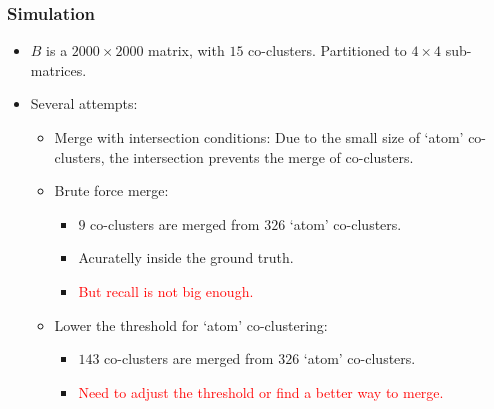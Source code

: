 \documentclass{beamer}
\begin{document}
\begin{frame}
    \frametitle{Simulation}

    \begin{itemize}
        \item $B$ is a $2000\times 2000$ matrix, with $15$ co-clusters. Partitioned to $4\times 4$ sub-matrices.
        \item Several attempts:
              \begin{itemize}
                  \item Merge with intersection conditions:
                        Due to the small size of `atom' co-clusters, the intersection prevents the merge of co-clusters.
                  \item Brute force merge:
                        \begin{itemize}
                            \item $9$ co-clusters are merged from $326$ `atom' co-clusters.
                            \item Acuratelly inside the ground truth.
                            \item \textcolor{red}{But recall is not big enough.}
                        \end{itemize}
                  \item Lower the threshold for `atom' co-clustering:
                        \begin{itemize}
                            \item $143$ co-clusters are merged from $326$ `atom' co-clusters.
                            \item \textcolor{red}{Need to adjust the threshold or find a better way to merge.}
                        \end{itemize}
              \end{itemize}
    \end{itemize}

\end{frame}
\end{document}
